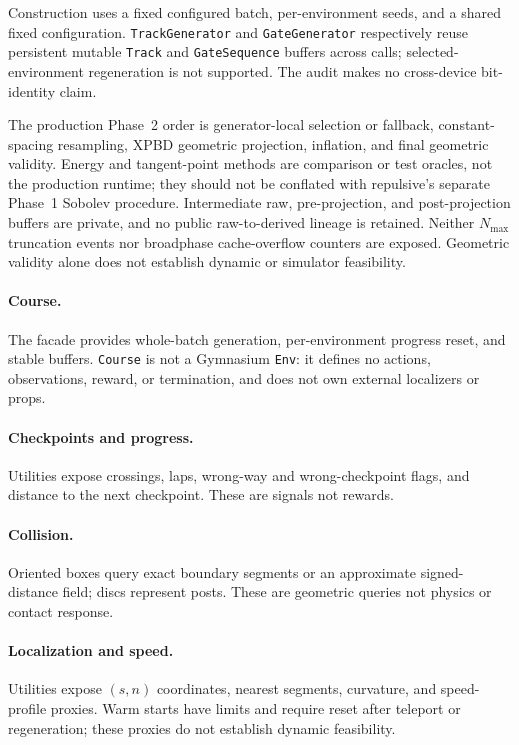 Construction uses a fixed configured batch, per-environment seeds, and a shared fixed
configuration. \texttt{TrackGenerator} and \texttt{GateGenerator} respectively reuse
persistent mutable \texttt{Track} and \texttt{GateSequence} buffers across calls;
selected-environment regeneration is not supported. The audit makes no cross-device
bit-identity claim.

The production Phase~2 order is generator-local selection or fallback,
constant-spacing resampling, XPBD geometric projection, inflation, and final
geometric validity. Energy and tangent-point methods are comparison or test oracles,
not the production runtime; they should not be conflated with repulsive's separate
Phase~1 Sobolev procedure. Intermediate raw, pre-projection, and post-projection
buffers are private, and no public raw-to-derived lineage is retained. Neither
$N_{\max}$ truncation events nor broadphase cache-overflow counters are exposed.
Geometric validity alone does not establish dynamic or simulator feasibility.



\paragraph{Course.}
The facade provides whole-batch generation, per-environment progress reset, and stable
buffers. \texttt{Course} is not a Gymnasium \texttt{Env}: it defines no actions,
observations, reward, or termination, and does not own external localizers or props.

\paragraph{Checkpoints and progress.}
Utilities expose crossings, laps, wrong-way and wrong-checkpoint flags, and distance to
the next checkpoint. These are signals not rewards.

\paragraph{Collision.}
Oriented boxes query exact boundary segments or an approximate signed-distance field;
discs represent posts. These are geometric queries not physics or contact response.

\paragraph{Localization and speed.}
Utilities expose $(s,n)$ coordinates, nearest segments, curvature, and speed-profile
proxies. Warm starts have limits and require reset after teleport or regeneration;
these proxies do not establish dynamic feasibility.

